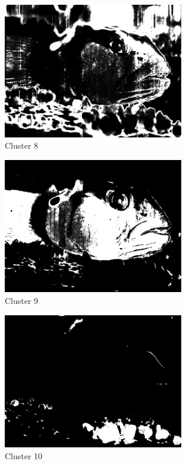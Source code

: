 \documentclass{article}      %
\begin{document}
\begin{figure}[H]
\centering
\includegraphics[width=0.7\textwidth]{partd_wts_cluster7}
\caption{Cluster 8}
\end{figure}

\begin{figure}[H]
\centering
\includegraphics[width=0.7\textwidth]{partd_wts_cluster8}
\caption{Cluster 9}
\end{figure}

\begin{figure}[H]
\centering
\includegraphics[width=0.7\textwidth]{partd_wts_cluster9}
\caption{Cluster 10}
\end{figure}
\end{document}
